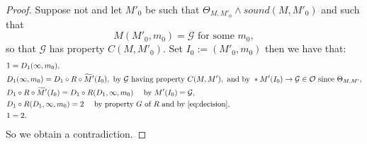 \documentclass{amsart}  %
\numberwithin{equation}{section}
\theoremstyle{definition}
\theoremstyle{remark}
\begin{document}
{\begin{proof} Suppose not and let $M' _{0} $ be such that
$\Theta _{M,M' _{0} } \land sound (M,M' _{0} )$ and such that
\begin{equation*} 
M (M' _{0},m _{0} ) = \mathcal{G}  \text{ for some $m _{0}$},
\end{equation*}
so that $\mathcal{G}$ has property $C (M,M' _{0})$.
Set $I _{0}:= (M' _{0} ,m _{0} )$ then we have that:
\begin{align*} \label{eq:MS}
      & 1= D_1 (\infty, m _{0} ), \\
      &  D_1 (\infty, m _{0}) = D_1 \circ R \circ  \widetilde{M}'(I _{0} ),  \text{ by $\mathcal{G}$ having property $C (M,M')$} , \text{ and by } *M'  (I _{0} ) \to \mathcal{G} \in \mathcal{O} \text{ since $\Theta _{M,M'} $},  \\
 &  D_1 \circ R \circ  \widetilde{M}'  (I _{0}) = D_1 \circ R (D_1, \infty, m _{0} )   \quad \text{ by $M' (I _{0} ) = \mathcal{G}$}, \\
 &  D_1 \circ R (D_1, \infty, m _{0} )=2 \quad \text{ by property $G$ of $R$ and by \eqref{eq:decision}}, \\
& 1=2.
\end{align*}
So we obtain a contradiction.
%
%
%


\end{proof}}
\end{document}
